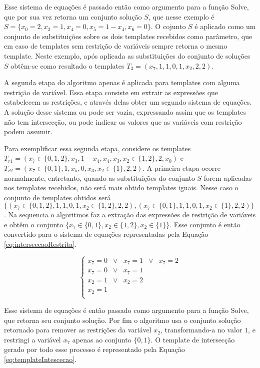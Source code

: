 	Esse sistema de equações é passado então como argumento para a função Solve, que por sua vez retorna um conjunto solução $S$, que nesse exemplo é $S = \{x_0 = 2, x_3 = 1, x_4 = 0, x_5 = 1 - x_4, x_6 = 0\}$. O cojunto $S$ é aplicado como um conjunto de substituições sobre os dois templates recebidos como parâmetro, que em caso de templates sem restrição de variáveis sempre retorna o mesmo template. Neste exemplo, após aplicada as substituições do conjunto de soluções $S$ obtêm-se como resultado o templates $T_3 = (x_7, 1, 1, 0, 1, x_2, 2, 2)$.

	A segunda etapa do algoritmo apenas é aplicada para templates com alguma restrição de variável. Essa etapa consiste em extrair as expressões que estabelecem as restrições, e através delas obter um segundo sistema de equações. A solução desse sistema ou pode ser vazia, expressando assim que os templates não tem intersecção, ou pode indicar os valores que as variáveis com restrição podem assumir.

	Para exemplificar essa segunda etapa, considere os templates $T_{r1} = (x_7 \in \{0,1,2\},x_3,1-x_4,x_4,x_3,x_2 \in \{1,2\},2,x_0)$ e $T_{r2} = (x_7 \in \{0,1\},1,x_5,0,x_3,x_2 \in \{1\},2,2)$. A primeira etapa ocorre normalmente, entretanto, quando as substituições do conjunto $S$ forem aplicadas nos templates recebidos, não será mais obtido templates iguais. Nesse caso o conjunto de templates obtidos será $\{(x_7 \in \{0,1,2\}, 1, 1, 0, 1, x_2 \in \{1,2\}, 2, 2), (x_7 \in \{0,1\}, 1, 1, 0, 1, x_2 \in \{1\}, 2, 2)\}$. Na sequencia o algoritmos faz a extração das expressões de restrição de variáveis e obtêm o conjunto $\{x_7 \in \{0,1\}, x_2 \in \{1,2\}, x_2 \in \{1\} \}$. Esse conjunto é então convertido para o sistema de equações representadas pela Equação \ref{eq:interseccaoRestrita}.

	\begin{equation}
	\left\{\begin{matrix}
	x_7	  = 0 	& \vee &	x_7	=	1 & \vee &	x_7	= 2	\\ 
	x_7   = 0 	& \vee &	x_7	=	1					\\ 
	x_2   = 1 	& \vee &	x_2	=	2					\\ 
	x_2	  =	1											\\ 
	\end{matrix}\right.
	\label{eq:interseccaoRestrita}
	\end{equation}

	Esse sistema de equações é então passado como argumento para a função Solve, que retorna seu conjunto solução. Por fim o algoritmo usa o conjunto solução retornado para remover as restrições da variável $x_2$, transformando-a no valor $1$, e restringi a variável $x_7$ apenas ao conjunto $\{0,1\}$. O template de intersecção gerado por todo esse processo é representado pela Equação \ref{eq:templateIntescecao}.


